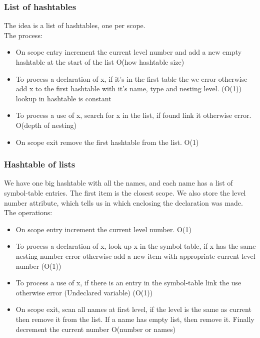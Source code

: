 \documentclass[12pt]{article}
\begin{document}
\subsubsection{List of hashtables}
The idea is a list of hashtables, one per scope.
\\ The process: 
\begin{itemize}
    \item On scope entry increment the current level number and add a new empty hashtable at the start of the list O(how hashtable size)
    \item To process a declaration of x, if it's in the first table the we error otherwise add x to the first hashtable with it's name, type and nesting level. (O(1)) lookup in hashtable is constant
    \item To process a use of x, search for x in the list, if found link it otherwise error. O(depth of nesting)
    \item On scope exit remove the first hashtable from the list. O(1) 
\end{itemize}

\subsubsection{Hashtable of lists} 
We have one big hashtable with all the names, and each name has a list of symbol-table entries. The first item is the closest scope. We also store the level number attribute, which tells us in which enclosing the declaration was made.
\\ The operations: 
\begin{itemize}
    \item On scope entry increment the current level number. O(1)
    \item To process a declaration of x, look up x in the symbol table, if x has the same nesting number error otherwise add a new item with appropriate current level number (O(1))
    \item To process a use of x, if there is an entry in the symbol-table link the use otherwise error (Undeclared variable) (O(1))
    \item On scope exit, scan all names at first level, if the level is the same as current then remove it from the list. If a name has empty list, then remove it. Finally decrement the current number O(number or names)
\end{itemize}
\end{document}
